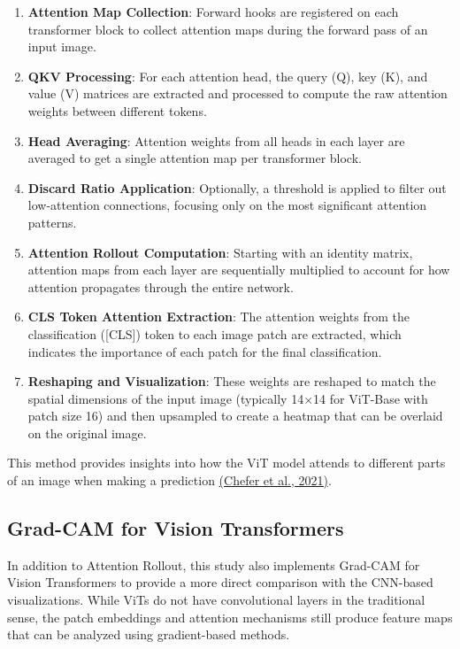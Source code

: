 \documentclass[a4paper,12pt]{article}
\begin{document}
\begin{enumerate}
    \item \textbf{Attention Map Collection}: Forward hooks are registered on each transformer block to collect attention maps during the forward pass of an input image.
    
    \item \textbf{QKV Processing}: For each attention head, the query (Q), key (K), and value (V) matrices are extracted and processed to compute the raw attention weights between different tokens.
    
    \item \textbf{Head Averaging}: Attention weights from all heads in each layer are averaged to get a single attention map per transformer block.
    
    \item \textbf{Discard Ratio Application}: Optionally, a threshold is applied to filter out low-attention connections, focusing only on the most significant attention patterns.
    
    \item \textbf{Attention Rollout Computation}: Starting with an identity matrix, attention maps from each layer are sequentially multiplied to account for how attention propagates through the entire network.
    
    \item \textbf{CLS Token Attention Extraction}: The attention weights from the classification ([CLS]) token to each image patch are extracted, which indicates the importance of each patch for the final classification.
    
    \item \textbf{Reshaping and Visualization}: These weights are reshaped to match the spatial dimensions of the input image (typically 14×14 for ViT-Base with patch size 16) and then upsampled to create a heatmap that can be overlaid on the original image.
\end{enumerate}

This method provides insights into how the ViT model attends to different parts of an image when making a prediction \href{https://arxiv.org/abs/2012.09838}{(Chefer et al., 2021)}.

\subsection{Grad-CAM for Vision Transformers}

In addition to Attention Rollout, this study also implements Grad-CAM for Vision Transformers to provide a more direct comparison with the CNN-based visualizations. While ViTs do not have convolutional layers in the traditional sense, the patch embeddings and attention mechanisms still produce feature maps that can be analyzed using gradient-based methods.
\end{document}
